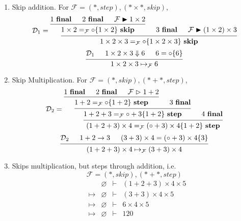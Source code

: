 \documentclass{article}
\newcommand{\evalsto}{\mathrel{\mathop{\Downarrow}}}
\newcommand{\entails}{\mathrel{\mathop{\vdash}}}
\newcommand{\steps}{\mathrel{\mathop{\vartriangleright}}}
\newcommand{\skips}{\mathrel{\mathop{\blacktriangleright}}}
\newcommand{\final}{~\mathbf{final}}
\newcommand{\istep}{~\mathbf{step}}
\newcommand{\iskip}{~\mathbf{skip}}
\begin{document}
\begin{enumerate}
  \item Skip addition. For \(\mathcal{F} = (\ast, step), (\ast \times \ast, skip)\),
    \[
      \mathcal{D}_1 = \begin{prooftree}
        \hypo{1 \final}
        \hypo{2 \final}
        \hypo{\mathcal{F} \skips 1 \times 2}
        \infer3{1 \times 2 =_\mathcal{F} \circ \{ 1 \times 2 \} \iskip}
        \hypo{3 \final}
        \hypo{\mathcal{F} \skips (1 \times 2) \times 3}
        \infer3{
          1 \times 2 \times 3
          =_\mathcal{F}
          \circ \{ 1 \times 2 \times 3 \} \iskip
        }
      \end{prooftree}
    \]
    \[
      \begin{prooftree}
        \hypo{\mathcal{D}_1}
        \hypo{1 \times 2 \times 3 \evalsto 6}
        \hypo{6 = \circ \{ 6 \}}
        \infer3{
          1 \times 2 \times 3 \mapsto_\mathcal{F} 6
        }
      \end{prooftree}
    \]

  \item Skip Multiplication. For \(\mathcal{F} = (\ast, skip), (\ast + \ast, step)\),
    \[
      \mathcal{D}_2 = \begin{prooftree}
        \hypo{1 \final}
        \hypo{2 \final}
        \hypo{\mathcal{F} \steps 1 + 2}
        \infer3{1 + 2 =_\mathcal{F} \circ \{ 1 + 2 \} \istep}
        \hypo{3 \final}
        \infer2{1 + 2 + 3 =_\mathcal{F} \circ + 3 \{ 1 + 2 \} \istep}
        \hypo{4 \final}
        \infer2{(1 + 2 + 3) \times 4 =_\mathcal{F} (\circ + 3) \times 4 \{ 1 + 2 \} \istep}
      \end{prooftree}
    \]
    \[
      \begin{prooftree}
        \hypo{\mathcal{D}_2}
        \hypo{1 + 2 \to 3}
        \hypo{(3 + 3) \times 4 = (\circ + 3) \times 4 \{ 3 \}}
        \infer3{(1 + 2 + 3) \times 4 \mapsto_\mathcal{F} (3 + 3) \times 4}
      \end{prooftree}
    \]

  \item Skips multiplication, but steps through addition, i.e.
    \[
      \mathcal{F} = (\ast, skip), (\ast + \ast, step)
    \]
    \[
      \begin{array}{lcrcl}
        & & \varnothing &\entails& (1 + 2 + 3) \times 4 \times 5 \\
        &\mapsto& \varnothing &\entails& (3 + 3) \times 4 \times 5 \\
        &\mapsto& \varnothing &\entails& 6 \times 4 \times 5 \\
        &\mapsto& \varnothing &\entails& 120
      \end{array}
    \]


\end{enumerate}
\end{document}
